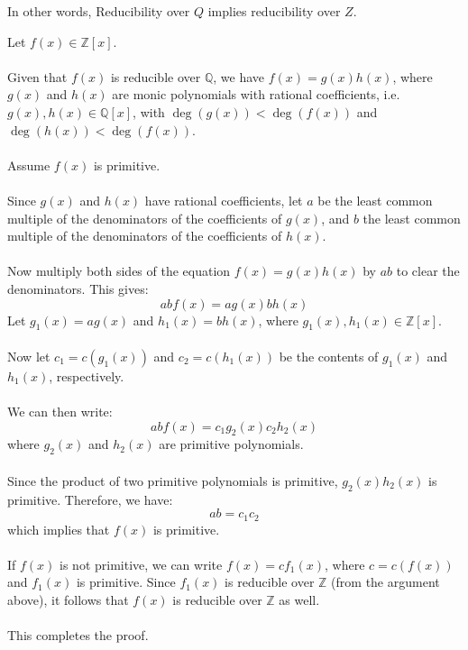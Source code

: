 \documentclass{article}
\newenvironment{proofbox}
  {\begin{mdframed}[linewidth=1pt,linecolor=black,backgroundcolor=white]\noindent\ignorespaces}
  {\end{mdframed}}
\begin{document}
In other words, Reducibility over $Q$ implies reducibility over $Z$.
\begin{proofbox}
    Let $f(x) \in \mathbb{Z}[x]$.\\\\
    Given that $f(x)$ is reducible over $\mathbb{Q}$, we have $f(x) = g(x)h(x)$, where $g(x)$ and $h(x)$ are monic polynomials with rational coefficients, i.e. $g(x), h(x) \in \mathbb{Q}[x]$, with $\deg(g(x)) < \deg(f(x))$ and $\deg(h(x)) < \deg(f(x))$.\\\\
    Assume $f(x)$ is primitive.\\\\
    Since $g(x)$ and $h(x)$ have rational coefficients, let $a$ be the least common multiple of the denominators of the coefficients of $g(x)$, and $b$ the least common multiple of the denominators of the coefficients of $h(x)$.\\\\
    Now multiply both sides of the equation $f(x) = g(x)h(x)$ by $ab$ to clear the denominators. This gives:
    \[
    abf(x) = ag(x)bh(x)
    \]
    Let $g_1(x) = ag(x)$ and $h_1(x) = bh(x)$, where $g_1(x), h_1(x) \in \mathbb{Z}[x]$.\\\\
    Now let $c_1 = c(g_1(x))$ and $c_2 = c(h_1(x))$ be the contents of $g_1(x)$ and $h_1(x)$, respectively.\\\\
    We can then write:
    \[
    abf(x) = c_1g_2(x)c_2h_2(x)
    \]
    where $g_2(x)$ and $h_2(x)$ are primitive polynomials.\\\\
    Since the product of two primitive polynomials is primitive, $g_2(x)h_2(x)$ is primitive. Therefore, we have:
    \[
    ab = c_1c_2
    \]
    which implies that $f(x)$ is primitive.\\\\
    If $f(x)$ is not primitive, we can write $f(x) = cf_1(x)$, where $c = c(f(x))$ and $f_1(x)$ is primitive. Since $f_1(x)$ is reducible over $\mathbb{Z}$ (from the argument above), it follows that $f(x)$ is reducible over $\mathbb{Z}$ as well.\\\\
    This completes the proof.
    \end{proofbox}
\end{document}
